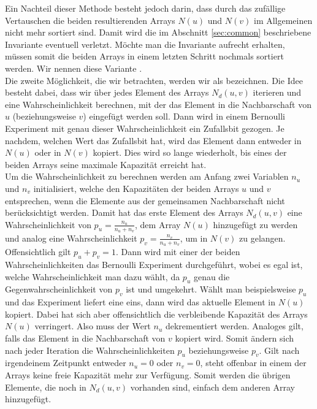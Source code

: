 Ein Nachteil dieser Methode besteht jedoch darin, dass durch das zufällige Vertauschen die beiden resultierenden Arrays
$N(u)$ und $N(v)$ im Allgemeinen nicht mehr sortiert sind. Damit wird die im Abschnitt \ref{sec:common} beschriebene
Invariante eventuell verletzt. Möchte man die Invariante aufrecht erhalten, müssen somit die beiden Arrays
in einem letzten Schritt nochmals sortiert werden.
Wir nennen diese Variante \perm.
\\

Die zweite Möglichkeit, die wir betrachten, werden wir als \distr{} bezeichnen.
Die Idee besteht dabei, dass wir über jedes Element des Arrays $N_{d}(u,v)$ iterieren und eine Wahrscheinlichkeit
berechnen, mit
der das Element in die Nachbarschaft von $u$ (beziehungsweise $v$) eingefügt werden soll. Dann wird in einem 
Bernoulli Experiment mit genau dieser Wahrscheinlichkeit ein Zufallsbit gezogen. Je nachdem, welchen
Wert das Zufallsbit hat, wird das Element dann entweder in $N(u)$ oder in $N(v)$ kopiert. Dies wird so lange
wiederholt, bis eines der beiden Arrays seine maximale Kapazität erreicht hat. 
\\

Um die Wahrscheinlichkeit zu berechnen werden am Anfang zwei Variablen $n_u$ und $n_v$ initialisiert, 
welche den Kapazitäten der beiden Arrays $u$ und $v$ entsprechen, wenn die Elemente aus der 
gemeinsamen Nachbarschaft nicht berücksichtigt werden. 
Damit hat das erste Element des Arrays $N_{d}(u,v)$ eine Wahrscheinlichkeit von $p_u = \frac{n_u}{n_u+n_v}$, dem
Array $N(u)$ hinzugefügt zu werden und analog eine Wahrscheinlichkeit $p_v = \frac{n_v}{n_u+n_v}$, um
in $N(v)$ zu gelangen. Offensichtlich gilt $p_u + p_v = 1$. Dann wird mit einer der beiden
Wahrscheinlichkeiten das Bernoulli Experiment durchgeführt, wobei es egal ist, welche Wahrscheinlichkeit
man dazu wählt, da $p_u$ genau die Gegenwahrscheinlichkeit von $p_v$ ist und umgekehrt. 
Wählt man beispielsweise $p_u$ und das Experiment liefert eine eins, dann wird das aktuelle Element
in $N(u)$ kopiert. Dabei
hat sich aber offensichtlich die verbleibende Kapazität des Arrays $N(u)$ verringert. Also muss
der Wert $n_u$ dekrementiert werden. Analoges gilt, falls das Element in die Nachbarschaft von $v$ kopiert wird.
Somit ändern sich nach jeder Iteration die Wahrscheinlichkeiten $p_u$ beziehungsweise $p_v$.
Gilt nach irgendeinem Zeitpunkt entweder $n_u = 0$ oder $n_v = 0$, steht offenbar in einem der Arrays 
keine freie Kapazität mehr zur Verfügung. Somit werden die übrigen Elemente, die noch in $N_{d}(u,v)$ vorhanden sind, 
einfach dem anderen Array hinzugefügt.
\\

